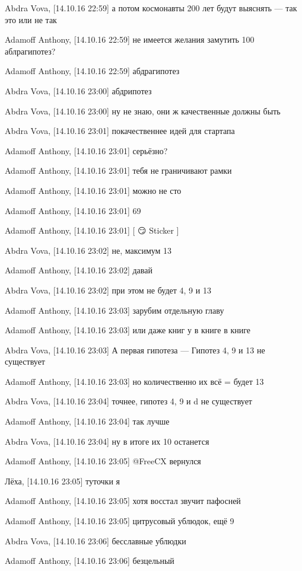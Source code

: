 Abdra Vova, [14.10.16 22:59]
а потом космонавты 200 лет будут выяснять — так это или не так

Adamoff Anthony, [14.10.16 22:59]
не имеется желания замутить 100 аблрагипотез?

Adamoff Anthony, [14.10.16 22:59]
абдрагипотез

Abdra Vova, [14.10.16 23:00]
абдрипотез

Abdra Vova, [14.10.16 23:00]
ну не знаю, они ж качественные должны быть

Abdra Vova, [14.10.16 23:01]
покачественнее идей для стартапа

Adamoff Anthony, [14.10.16 23:01]
серьёзно?

Adamoff Anthony, [14.10.16 23:01]
тебя не граничивают рамки

Adamoff Anthony, [14.10.16 23:01]
можно не сто

Adamoff Anthony, [14.10.16 23:01]
69

Adamoff Anthony, [14.10.16 23:01]
[ 😏 Sticker ]

Abdra Vova, [14.10.16 23:02]
не, максимум 13

Adamoff Anthony, [14.10.16 23:02]
давай

Abdra Vova, [14.10.16 23:02]
при этом не будет 4, 9 и 13

Adamoff Anthony, [14.10.16 23:03]
зарубим отдельную главу

Adamoff Anthony, [14.10.16 23:03]
или даже книг у в книге в книге

Abdra Vova, [14.10.16 23:03]
А первая гипотеза — Гипотез 4, 9 и 13 не существует

Adamoff Anthony, [14.10.16 23:03]
но количественно их всё = будет 13

Abdra Vova, [14.10.16 23:04]
точнее, гипотез 4, 9  и d не существует

Adamoff Anthony, [14.10.16 23:04]
так лучше

Abdra Vova, [14.10.16 23:04]
ну в итоге их 10 останется

Adamoff Anthony, [14.10.16 23:05]
@FreeCX вернулся

Лёха, [14.10.16 23:05]
туточки я

Adamoff Anthony, [14.10.16 23:05]
хотя восстал звучит пафосней

Adamoff Anthony, [14.10.16 23:05]
цитрусовый ублюдок, ещё 9

Abdra Vova, [14.10.16 23:06]
бесславные ублюдки

Adamoff Anthony, [14.10.16 23:06]
безцельный

